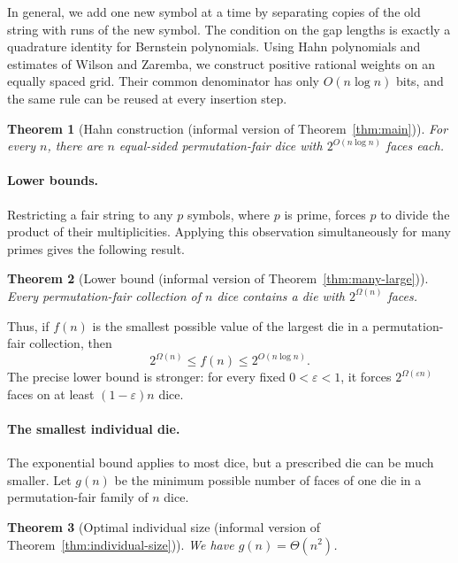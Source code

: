 \documentclass[11pt]{article}
\newtheorem{theorem}{Theorem}[section]
\theoremstyle{definition}
\theoremstyle{remark}
\begin{document}
In general, we add one new symbol at a time by separating copies of the old
string with runs of the new symbol.  The condition on the gap lengths is
exactly a quadrature identity for Bernstein polynomials.  Using Hahn
polynomials and estimates of Wilson and Zaremba, we construct positive
rational weights on an equally spaced grid.  Their common denominator has
only \(O(n\log n)\) bits, and the same rule can be reused at every insertion
step.

\begin{theorem}[Hahn construction
  (informal version of Theorem~\ref{thm:main})]
For every \(n\), there are \(n\) equal-sided permutation-fair dice with
\(2^{O(n\log n)}\) faces each.
\end{theorem}

\paragraph{Lower bounds.}
Restricting a fair string to any \(p\) symbols, where \(p\) is prime, forces
\(p\) to divide the product of their multiplicities.  Applying this
observation simultaneously for many primes gives the following result.

\begin{theorem}[Lower bound
  (informal version of Theorem~\ref{thm:many-large})]
Every permutation-fair collection of \(n\) dice contains a die with
\(2^{\Omega(n)}\) faces.
\end{theorem}

Thus, if \(f(n)\) is the smallest possible value of the largest die in a
permutation-fair collection, then
\[
  2^{\Omega(n)}\leq f(n)\leq2^{O(n\log n)}.
\]
The precise lower bound is stronger: for every fixed
\(0<\varepsilon<1\), it forces \(2^{\Omega(\varepsilon n)}\) faces on at
least \((1-\varepsilon)n\) dice.

\paragraph{The smallest individual die.}
The exponential bound applies to most dice, but a prescribed die can be much
smaller.  Let \(g(n)\) be the minimum possible number of faces of one die
in a permutation-fair family of \(n\) dice.

\begin{theorem}[Optimal individual size
  (informal version of Theorem~\ref{thm:individual-size})]
We have \(g(n)=\Theta(n^2)\).
\end{theorem}
\end{document}
